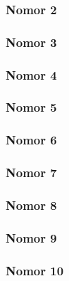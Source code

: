 \subsubsection{Nomor 2}
\hfill\break



\subsubsection{Nomor 3}
\hfill\break



\subsubsection{Nomor 4}
\hfill\break



\subsubsection{Nomor 5}
\hfill\break



\subsubsection{Nomor 6}
\hfill\break



\subsubsection{Nomor 7}
\hfill\break



\subsubsection{Nomor 8}
\hfill\break



\subsubsection{Nomor 9}
\hfill\break



\subsubsection{Nomor 10}
\hfill\break



